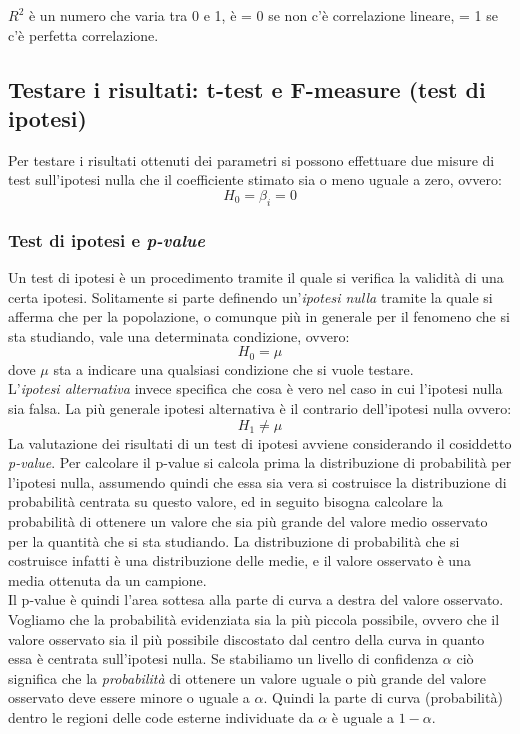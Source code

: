 \documentclass[]{article}
\begin{document}
$R^2$ è un numero che varia tra 0 e 1, è = 0 se non c'è correlazione lineare, = 1 se c'è perfetta correlazione.

\subsection{Testare i risultati: t-test e F-measure (test di ipotesi)}
Per testare i risultati ottenuti dei parametri si possono effettuare due misure di test sull'ipotesi nulla che il coefficiente stimato sia o meno uguale a zero, ovvero:
\begin{equation}
H_0 = \beta_i = 0
\end{equation}

\subsubsection{Test di ipotesi e \textit{p-value}}
Un test di ipotesi è un procedimento tramite il quale si verifica la validità di una certa ipotesi. Solitamente si parte definendo un'\textit{ipotesi nulla} tramite la quale si afferma che per la popolazione, o comunque più in generale per il fenomeno che si sta studiando, vale una determinata condizione, ovvero:
\begin{equation}
H_0 = \mu 
\end{equation}
dove $\mu$ sta a indicare una qualsiasi condizione che si vuole testare. \\
L'\textit{ipotesi alternativa} invece specifica che cosa è vero nel caso in cui l'ipotesi nulla sia falsa. La più generale ipotesi alternativa è il contrario dell'ipotesi nulla ovvero:
\begin{equation}
H_1 \neq \mu 
\end{equation}
La valutazione dei risultati di un test di ipotesi avviene considerando il cosiddetto \textit{p-value}. Per calcolare il p-value si calcola prima la distribuzione di probabilità per l'ipotesi nulla, assumendo quindi che essa sia vera si costruisce la distribuzione di probabilità centrata su questo valore, ed in seguito bisogna calcolare la probabilità di ottenere un valore che sia più grande del valore medio osservato per la quantità che si sta studiando. La distribuzione di probabilità che si costruisce infatti è una distribuzione delle  medie, e il valore osservato è una media ottenuta da un campione.\\ 
Il p-value è quindi l'area sottesa alla parte di curva a destra del valore osservato.
Vogliamo che la probabilità evidenziata sia la più piccola possibile, ovvero che il valore osservato sia il più possibile discostato dal centro della curva in quanto essa è centrata sull'ipotesi nulla. Se stabiliamo un livello di confidenza $\alpha$ ciò significa che la \textit{probabilità} di ottenere un valore uguale o più grande del valore osservato deve essere minore o uguale a $\alpha$. Quindi la parte di curva (probabilità) dentro le regioni delle code esterne individuate da $\alpha$ è uguale a $1-\alpha$.
\end{document}
